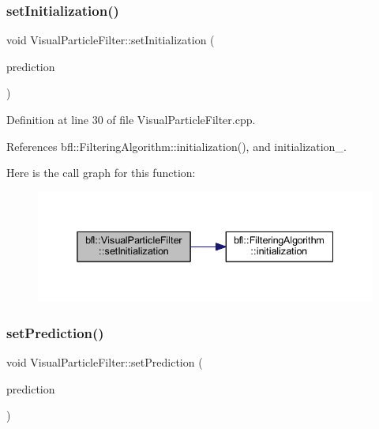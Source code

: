 \subsubsection{\texorpdfstring{set\+Initialization()}{setInitialization()}}
{\footnotesize\ttfamily void Visual\+Particle\+Filter\+::set\+Initialization (\begin{DoxyParamCaption}\item[{std\+::unique\+\_\+ptr$<$ \mbox{\hyperlink{classbfl_1_1Initialization}{Initialization}} $>$}]{prediction }\end{DoxyParamCaption})}



Definition at line 30 of file Visual\+Particle\+Filter.\+cpp.



References bfl\+::\+Filtering\+Algorithm\+::initialization(), and initialization\+\_\+.

Here is the call graph for this function\+:
\nopagebreak
\begin{figure}[H]
\begin{center}
\leavevmode
\includegraphics[width=338pt]{classbfl_1_1VisualParticleFilter_ac254d164f51ddbef8c79f8f1a7863a8d_cgraph}
\end{center}
\end{figure}
\mbox{\label{classbfl_1_1VisualParticleFilter_addc3e844aa3fe41fb2241eb2215d0c63}} 
\subsubsection{\texorpdfstring{set\+Prediction()}{setPrediction()}}
{\footnotesize\ttfamily void Visual\+Particle\+Filter\+::set\+Prediction (\begin{DoxyParamCaption}\item[{std\+::unique\+\_\+ptr$<$ \mbox{\hyperlink{classbfl_1_1PFPrediction}{P\+F\+Prediction}} $>$}]{prediction }\end{DoxyParamCaption})}



